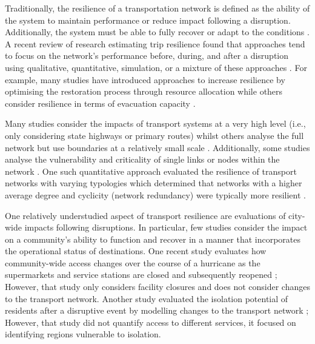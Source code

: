 \documentclass[review,3p,times,onecolumn,sort&compress,12pt]{elsarticle}
\let \cite \parencite
\begin{document}
Traditionally, the resilience of a transportation network is defined as the ability of the system to maintain performance or reduce impact following a disruption. Additionally, the system must be able to fully recover or adapt to the conditions \cite{Mason2021-bq, Zhang2015-xz, Aghababaei2021-qp}.
A recent review of research estimating trip resilience found that approaches tend to focus on the network's performance before, during, and after a disruption using qualitative, quantitative, simulation, or a mixture of these approaches \cite{Aghababaei2021-qp}.
For example, many studies have introduced approaches to increase resilience by optimising the restoration process through resource allocation \cite{Sun2020-ln, Li2020-nq, Ozdamar2014-fh, Tuzun_Aksu2014-gq} while others consider resilience in terms of evacuation capacity \cite{Tuzun_Aksu2014-gq, Cova1997-vl}.

Many studies consider the impacts of transport systems at a very high level (i.e., only considering state highways or primary routes) whilst others analyse the full network but use boundaries at a relatively small scale \cite{Dalziell2001-un, Khademi2015-jq, Tuzun_Aksu2014-gq, Nicholson2007-zc, Jenelius2012-vp, Chang2001-bq, Bono2011-dk, Sohn2006-vg, Taylor2012-jw, El-Rashidy2014-ut}.
Additionally, some studies analyse the vulnerability and criticality of single links or nodes within the network \cite{Zhang2016-vq, Balijepalli2014-zh}.
One such quantitative approach evaluated the resilience of transport networks with varying typologies which determined that networks with a higher average degree and cyclicity (network redundancy) were typically more resilient \cite{Zhang2015-xz}.

One relatively understudied aspect of transport resilience are evaluations of city-wide impacts following disruptions. In particular, few studies consider the impact on a community's ability to function and recover in a manner that incorporates the operational status of destinations. 
One recent study evaluates how community-wide access changes over the course of a hurricane as the supermarkets and service stations are closed and subsequently reopened \cite{logan2020reframing};
However, that study only considers facility closures and does not consider changes to the transport network.
Another study evaluated the isolation potential of residents after a disruptive event by modelling changes to the transport network \cite{Bono2011-dk}; 
However, that study did not quantify access to different services, it focused on identifying regions vulnerable to isolation.
\end{document}
